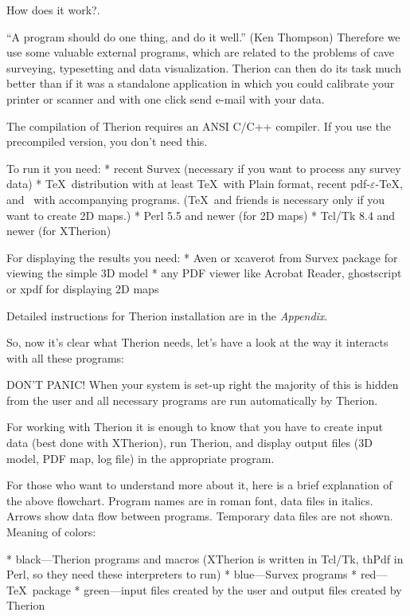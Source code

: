 \subchapter How does it work?.

``A program should do one thing, and do it well.'' (Ken Thompson) 
Therefore we use some valuable external programs, which are related to the problems of cave 
surveying, typesetting and data visualization. Therion can then do its task 
much better than if it was a standalone application in which you could calibrate 
your printer or scanner and with one click send e-mail with your data.

The compilation of Therion requires an ANSI C/C++ compiler. 
If you use the precompiled version, you don't need this.

To run it you need:
\list
* recent Survex (necessary if you want to process any survey data)
* \TeX\ distribution with at least \TeX\ with Plain format, 
  recent pdf-$\varepsilon$-\TeX, and \MP\ with accompanying programs. 
  (\TeX\ and friends is necessary only if you want to create 2D maps.)
* Perl 5.5 and newer (for 2D maps)
* Tcl/Tk 8.4 and newer (for XTherion)
\endlist

For displaying the results you need:
\list
* Aven or xcaverot from Survex package for viewing the simple 3D model
* any PDF viewer like Acrobat Reader, ghostscript or xpdf for displaying  
  2D maps
\endlist

Detailed instructions for Therion installation are in the {\it Appendix}.

So, now it's clear what Therion needs, let's have a look at the way 
it interacts with all these programs:


DON'T PANIC! When your system is set-up right the majority of this is hidden from 
the user and all necessary programs are run automatically by Therion. 

For working with Therion it is enough to know that you have to create input data 
(best done with XTherion), run Therion, and display output files 
(3D model, PDF map, log file) in the appropriate program. 

For those who want to understand more about it, here is a brief explanation of 
the above flowchart. Program names are in roman font, data files in italics. 
Arrows show data flow between programs. Temporary data files are not shown. 
Meaning of colors:

\list
* black---Therion programs and macros (XTherion is written in Tcl/Tk, thPdf in
  Perl, so they need these interpreters to run)
* blue---Survex programs
* red---\TeX\ package
* green---input files created by the user and output files created by Therion
\endlist

